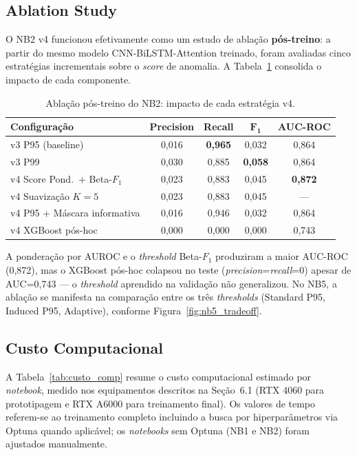 \documentclass[12pt]{article}
\begin{document}
\subsection{Ablation Study}

O NB2 v4 funcionou efetivamente como um estudo de ablação \textbf{pós-treino}: a partir do mesmo modelo CNN-BiLSTM-Attention treinado, foram avaliadas cinco estratégias incrementais sobre o \textit{score} de anomalia. A Tabela~\ref{tab:ablation_nb2} consolida o impacto de cada componente.

\begin{table}[!ht]
\centering
\small
\begin{tabular}{l|c|c|c|c}
\hline
\textbf{Configuração} & \textbf{Precision} & \textbf{Recall} & $\boldsymbol{F_1}$ & \textbf{AUC-ROC} \\
\hline
v3 P95 (baseline)               & 0,016 & \textbf{0,965} & 0,032 & 0,864 \\
v3 P99                          & 0,030 & 0,885 & \textbf{0,058} & 0,864 \\
v4 Score Pond.\ + Beta-$F_1$    & 0,023 & 0,883 & 0,045 & \textbf{0,872} \\
v4 Suavização $K=5$             & 0,023 & 0,883 & 0,045 & --- \\
v4 P95 + Máscara informativa    & 0,016 & 0,946 & 0,032 & 0,864 \\
v4 XGBoost pós-hoc              & 0,000 & 0,000 & 0,000 & 0,743 \\
\hline
\end{tabular}
\caption{Ablação pós-treino do NB2: impacto de cada estratégia v4.}
\label{tab:ablation_nb2}
\end{table}

A ponderação por AUROC e o \textit{threshold} Beta-$F_1$ produziram a maior AUC-ROC (0,872), mas o XGBoost pós-hoc colapsou no teste (\textit{precision}=\textit{recall}=0) apesar de AUC=0,743 --- o \textit{threshold} aprendido na validação não generalizou. No NB5, a ablação se manifesta na comparação entre os três \textit{thresholds} (Standard P95, Induced P95, Adaptive), conforme Figura~\ref{fig:nb5_tradeoff}.

\subsection{Custo Computacional}

A Tabela~\ref{tab:custo_comp} resume o custo computacional estimado por \textit{notebook}, medido nos equipamentos descritos na Seção~6.1 (RTX 4060 para prototipagem e RTX A6000 para treinamento final). Os valores de tempo referem-se ao treinamento completo incluindo a busca por hiperparâmetros via Optuna quando aplicável; os \textit{notebooks} sem Optuna (NB1 e NB2) foram ajustados manualmente.
\end{document}
